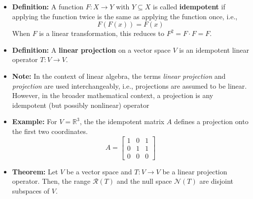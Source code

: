 \documentclass[11pt,twoside]{report}
\newcommand{\bbR}{{\mathbb{R}}}
\newcommand{\vecnot}{\underline}
\begin{document}
\begin{itemize}
\item \textbf{Definition:} 
A function $F \colon X \rightarrow Y$ with $Y \subseteq X$ is called \textbf{idempotent} if applying the function twice is the same as applying the function once, i.e., 
\[
F(F(x))=F(x)
\]
When $F$ is a linear transformation, this reduces to $F^2 = F \cdot F = F$.

\item \textbf{Definition:} %
 A \textbf{linear projection} on a vector space $V$ is an idempotent linear operator $T \colon V \rightarrow V$. %

\item \textbf{Note:} In the context of linear algebra, the terms \emph{linear projection} and \emph{projection} are used interchangeably, i.e., projections are assumed to be linear. However, in the broader mathematical context, a projection is any  idempotent (but possibly nonlinear)  operator 


\item \textbf{Example:} For $V = \bbR^3$, the the idempotent matrix $A$ defines a projection onto the first two coordinates. 
\begin{equation*}
A = \begin{bmatrix}
1 & 0 & 1 \\
0 & 1 & 1 \\
0 & 0 & 0
\end{bmatrix}
\end{equation*}


\item \textbf{Theorem:}  
Let $V$ be a vector space and $T \colon V \rightarrow V$ be a  linear projection operator.
Then, the range $\mathcal{R}(T)$ and the  null space $\mathcal{N}(T)$ are disjoint subspaces of $V$.


\end{itemize}
\end{document}
